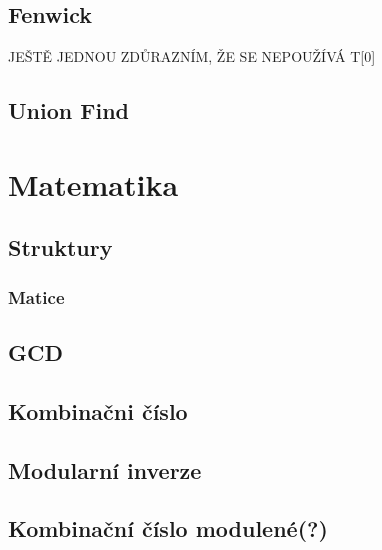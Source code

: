 \documentclass[10pt, a4paper, twoside]{article}
\begin{document}
\subsection{Fenwick}
JEŠTĚ JEDNOU ZDŮRAZNÍM, ŽE SE NEPOUŽÍVÁ T[0]


\subsection{Union Find}


\newpage

\section{Matematika}

\subsection{Struktury}
\subsubsection{Matice}


\subsection{GCD}


\subsection{Kombinačni číslo}


\subsection{Modularní inverze}


\subsection{Kombinační číslo modulené(?)}

\end{document}
